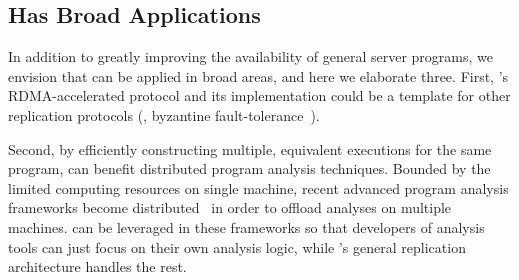 






\subsection{\xxx Has Broad Applications}\label{sec:apps}

In addition to greatly improving the availability of general server programs, 
we envision that \xxx can be applied in broad areas, and here we elaborate 
three. First, \xxx's RDMA-accelerated \paxos protocol and its implementation 
could be a template for other replication protocols (\eg, byzantine 
fault-tolerance~\cite{zyzzyva:sosp07,pbft:osdi99}). 



Second, by efficiently constructing multiple, equivalent executions for the 
same program, \xxx can benefit distributed program analysis techniques. Bounded 
by the limited computing resources on single machine, recent advanced 
program analysis frameworks become 
distributed~\cite{decouple:usenix08, speck:asplos08, 
shadowreplica:ccs13, wester:parallelizing:asplos13,repframe:apsys15} in order to 
offload analyses on multiple machines. \xxx can be leveraged in these 
frameworks so that developers of analysis tools can just focus on their own 
analysis logic, while \xxx's general replication architecture handles the rest.

